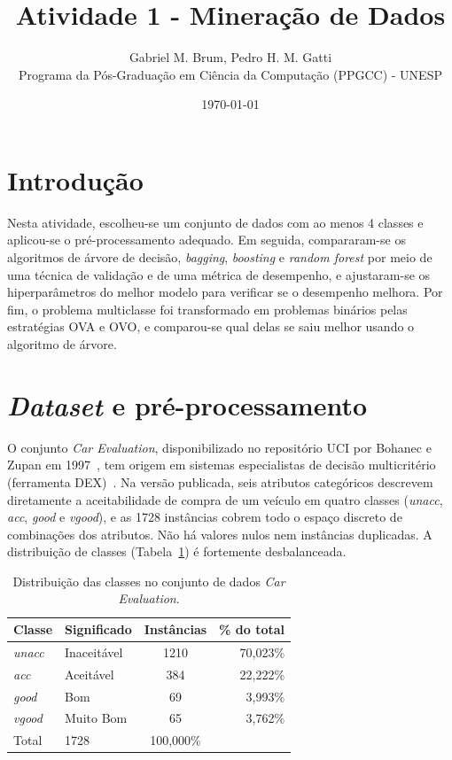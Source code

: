 \documentclass[11pt, a4paper]{article}
\title{Atividade 1 - Mineração de Dados}
\author{Gabriel M. Brum,  Pedro H. M. Gatti  \\ Programa da Pós-Graduação em Ciência da Computação (PPGCC) - UNESP}
\date{\today}
\begin{document}
\maketitle

\section{Introdução}

Nesta atividade, escolheu-se um conjunto de dados com ao menos 4 classes e aplicou-se o pré-processamento adequado. Em seguida, compararam-se os algoritmos de árvore de decisão, \textit{bagging}, \textit{boosting} e \textit{random forest} por meio de uma técnica de validação e de uma métrica de desempenho, e ajustaram-se os hiperparâmetros do melhor modelo para verificar se o desempenho melhora. Por fim, o problema multiclasse foi transformado em problemas binários pelas estratégias OVA e OVO, e comparou-se qual delas se saiu melhor usando o algoritmo de árvore.

\section{\textit{Dataset} e pré-processamento}

O conjunto \textit{Car Evaluation}, disponibilizado no repositório UCI por Bohanec e Zupan em 1997~\cite{zupan1997machine}, tem origem em sistemas especialistas de decisão multicritério (ferramenta DEX)~\cite{bohanec1988knowledge}. Na versão publicada, seis atributos categóricos descrevem diretamente a aceitabilidade de compra de um veículo em quatro classes (\textit{unacc}, \textit{acc}, \textit{good} e \textit{vgood}), e as 1728 instâncias cobrem todo o espaço discreto de combinações dos atributos. Não há valores nulos nem instâncias duplicadas. A distribuição de classes (Tabela~\ref{tab:distribuicao_classes}) é fortemente desbalanceada.

\begin{table}[htbp]
    \centering
    \caption{Distribuição das classes no conjunto de dados \textit{Car Evaluation}.}
    \label{tab:distribuicao_classes}
    \begin{tabular}{llcr}
        \toprule
        Classe & Significado &Instâncias & \% do total \\
        \midrule
        \textit{unacc} & Inaceitável & 1210 & 70{,}023\% \\
        \textit{acc}   & Aceitável & 384  & 22{,}222\% \\
        \textit{good}  & Bom & 69   & 3{,}993\%  \\
        \textit{vgood} & Muito Bom & 65   & 3{,}762\%  \\
        \midrule
        Total  & 1728 & 100{,}000\% \\
        \bottomrule
    \end{tabular}
\end{table}
\end{document}
